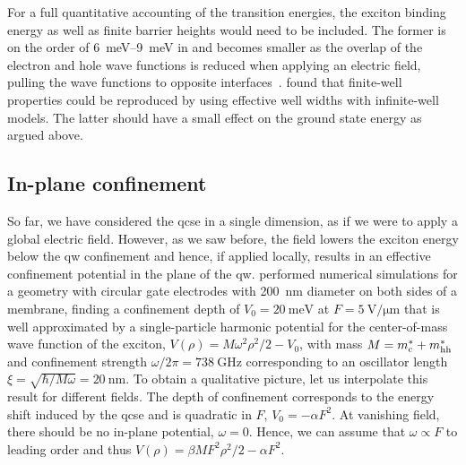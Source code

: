 For a full quantitative accounting of the transition energies, the exciton binding energy as well as finite barrier heights would need to be included.
The former is on the order of \qtyrange{6}{9}{\milli\electronvolt} in  and becomes smaller as the overlap of the electron and hole wave functions is reduced when applying an electric field, pulling the wave functions to opposite interfaces~\cite{Miller1984}.
 found that finite-well properties could be reproduced by using effective well widths with infinite-well models.
The latter should have a small effect on the ground state energy as argued above.

\subsection{In-plane confinement}\label{subsec:exp:theory:qcse:trap}
So far, we have considered the \gls{qcse} in a single dimension, as if we were to apply a global electric field.
However, as we saw before, the field lowers the exciton energy below the \gls{qw} confinement and hence, if applied locally, results in an effective confinement potential in the plane of the \gls{qw}.
\citet{Descamps2021} performed numerical simulations for a geometry with circular gate electrodes with \qty{200}{\nano\meter} diameter on both sides of a membrane, finding a confinement depth of $V_0 =\qty{20}{\milli\electronvolt}$ at $F=\qty{5}{\volt\per\micro\meter}$ that is well approximated by a single-particle harmonic potential for the center-of-mass wave function of the exciton, $V(\rho) = M\omega^{2}\rho^{2}/2 - V_0$, with mass $M = m^\ast_{\mathrm{c}} + m^\ast_{\mathrm{hh}}$ and confinement strength $\omega/2\pi = \qty{738}{\giga\hertz}$ corresponding to an oscillator length $\xi=\sqrt{\hbar/M\omega}=\qty{20}{\nano\meter}$.
To obtain a qualitative picture, let us interpolate this result for different fields.
The depth of confinement corresponds to the energy shift induced by the \gls{qcse} and is quadratic in $F$, $V_0 = -\alpha F^2$.
At vanishing field, there should be no in-plane potential, $\omega=0$.
Hence, we can assume that $\omega\propto F$ to leading order and thus $V(\rho) = \beta M F^{2} \rho^{2}/2 - \alpha F^{2}$.

